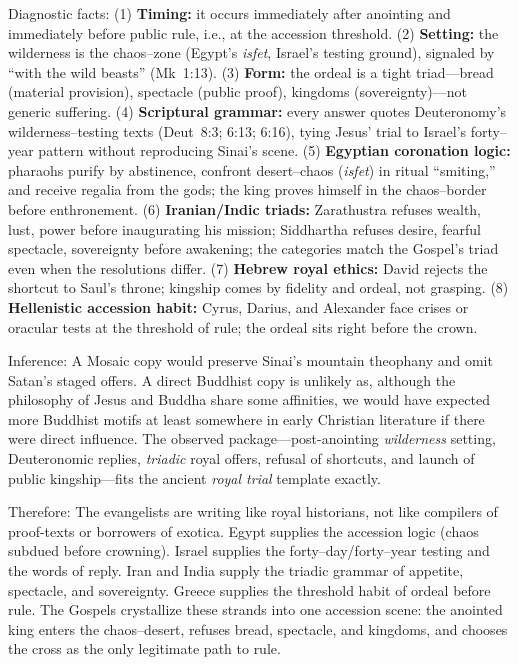 Diagnostic facts:
(1) \textbf{Timing:} it occurs immediately after anointing and immediately before public rule, i.e., at the accession threshold.
(2) \textbf{Setting:} the wilderness is the chaos–zone (Egypt’s \emph{isfet}, Israel’s testing ground), signaled by “with the wild beasts” (Mk~1:13).
(3) \textbf{Form:} the ordeal is a tight triad—bread (material provision), spectacle (public proof), kingdoms (sovereignty)—not generic suffering.
(4) \textbf{Scriptural grammar:} every answer quotes Deuteronomy’s wilderness–testing texts (Deut~8:3; 6:13; 6:16), tying Jesus’ trial to Israel’s forty–year pattern without reproducing Sinai’s scene.
(5) \textbf{Egyptian coronation logic:} pharaohs purify by abstinence, confront desert–chaos (\emph{isfet}) in ritual “smiting,” and receive regalia from the gods; the king proves himself in the chaos–border before enthronement.
(6) \textbf{Iranian/Indic triads:} Zarathustra refuses wealth, lust, power before inaugurating his mission; Siddhartha refuses desire, fearful spectacle, sovereignty before awakening; the categories match the Gospel’s triad even when the resolutions differ.
(7) \textbf{Hebrew royal ethics:} David rejects the shortcut to Saul’s throne; kingship comes by fidelity and ordeal, not grasping.
(8) \textbf{Hellenistic accession habit:} Cyrus, Darius, and Alexander face crises or oracular tests at the threshold of rule; the ordeal sits right before the crown.

Inference:
A Mosaic copy would preserve Sinai’s mountain theophany and omit Satan’s staged offers.
A direct Buddhist copy is unlikely as, although the philosophy of Jesus and Buddha share some affinities, we would have expected more Buddhist motifs at least somewhere in early Christian literature if there were direct influence.
The observed package—post-anointing \emph{wilderness} setting, Deuteronomic replies, \emph{triadic} royal offers, refusal of shortcuts, and launch of public kingship—fits the ancient \emph{royal trial} template exactly.

Therefore:
The evangelists are writing like royal historians, not like compilers of proof-texts or borrowers of exotica.
Egypt supplies the accession logic (chaos subdued before crowning).
Israel supplies the forty–day/forty–year testing and the words of reply.
Iran and India supply the triadic grammar of appetite, spectacle, and sovereignty.
Greece supplies the threshold habit of ordeal before rule.
The Gospels crystallize these strands into one accession scene: the anointed king enters the chaos–desert, refuses bread, spectacle, and kingdoms, and chooses the cross as the only legitimate path to rule.

